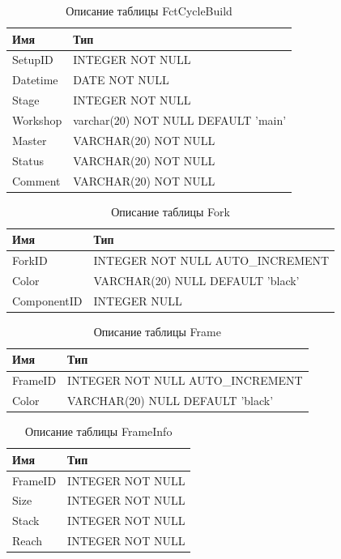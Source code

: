 \begin{table}[h!] 
	\centering
	\caption{Описание таблицы FctCycleBuild}
	\begin{tabular}{|l|l|}
		\hline \textbf{Имя} & \textbf{Тип} \\
		\hline
		SetupID &       INTEGER NOT NULL \\ \hline
		Datetime &      DATE NOT NULL \\ \hline
		Stage & INTEGER NOT NULL \\ \hline
		Workshop &      varchar(20) NOT NULL DEFAULT 'main' \\ \hline
		Master &        VARCHAR(20) NOT NULL \\ \hline
		Status &        VARCHAR(20) NOT NULL \\ \hline
		Comment &       VARCHAR(20) NOT NULL \\ \hline
	\end{tabular}
	\label{}
\end{table}


\begin{table}[h!] 
	\centering
	\caption{Описание таблицы Fork}
	\begin{tabular}{|l|l|}
		\hline \textbf{Имя} & \textbf{Тип} \\
		\hline
		ForkID &  INTEGER NOT NULL AUTO\_INCREMENT \\ \hline
		Color & VARCHAR(20) NULL DEFAULT 'black' \\ \hline
		ComponentID &  INTEGER NULL \\ \hline
	\end{tabular}
	\label{ta:fork}
\end{table}



\begin{table}[h!] 
	\centering
	\caption{Описание таблицы Frame}
	\begin{tabular}{|l|l|}
		\hline \textbf{Имя} & \textbf{Тип} \\
		\hline
		FrameID &  INTEGER NOT NULL AUTO\_INCREMENT \\ \hline
		Color & VARCHAR(20) NULL DEFAULT 'black' \\ \hline
	\end{tabular}
	\label{tab:frame}
\end{table}



\begin{table}[h!] 
	\centering
	\caption{Описание таблицы FrameInfo}
	\begin{tabular}{|l|l|}
		\hline \textbf{Имя} & \textbf{Тип} \\
		\hline
		FrameID &       INTEGER NOT NULL \\ \hline
		Size & INTEGER NOT NULL \\ \hline
		Stack & INTEGER NOT NULL \\ \hline
		Reach & INTEGER NOT NULL \\ \hline
	\end{tabular}
	\label{tab:frameinfo}
\end{table}


